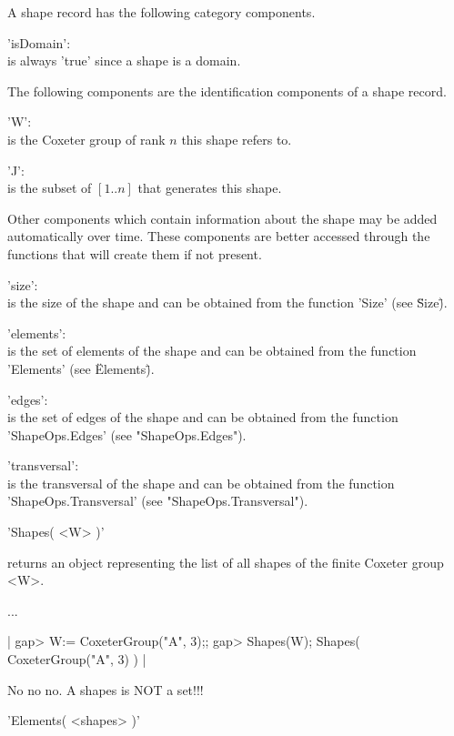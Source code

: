 A shape record has the following category components.

'isDomain': \\
        is always 'true' since a shape is a domain.
        
The  following components are  the identification  components of  a shape
record.

'W': \\
        is the Coxeter group of rank $n$ this shape refers to.

'J': \\
        is the subset of $[1..n]$ that generates this shape.
        
Other components which  contain information about the shape  may be added
automatically over  time.  These  components are better  accessed through
the functions that will create them if not present.

'size': \\
        is the  size of the shape  and can be obtained  from the function
        'Size' (see \"Size\").

'elements': \\
        is the set of elements of  the shape and can be obtained from the
        function 'Elements' (see \"Elements\").

'edges': \\
        is the  set of edges  of the shape  and can be obtained  from the
        function 'ShapeOps.Edges' (see "ShapeOps.Edges").

'transversal': \\
        is  the transversal of  the shape  and can  be obtained  from the
        function 'ShapeOps.Transversal' (see "ShapeOps.Transversal").



'Shapes( <W> )'

returns  an object  representing the  list of  all shapes  of  the finite
Coxeter group <W>.

...

|    gap> W:= CoxeterGroup("A", 3);;
    gap> Shapes(W);
    Shapes( CoxeterGroup("A", 3) ) |


No no no.  A shapes is NOT a set!!!

'Elements( <shapes> )'

